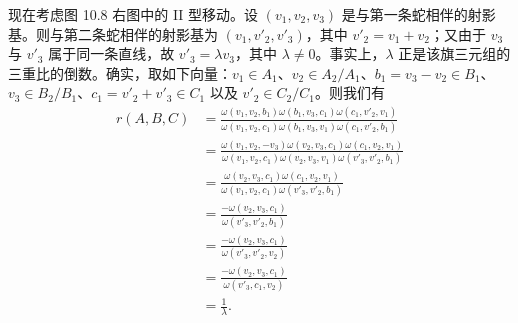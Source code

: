 现在考虑图 10.8 右图中的 II 型移动。设 $(v_1,v_2,v_3)$ 是与第一条蛇相伴的射影基。则与第二条蛇相伴的射影基为 $(v_1,v'_2,v'_3)$，其中 $v'_2=v_1+v_2$；又由于 $v_3$ 与 $v'_3$ 属于同一条直线，故 $v'_3=\lambda v_3$，其中 $\lambda\ne0$。事实上，$\lambda$ 正是该旗三元组的三重比的倒数。确实，取如下向量：$v_1\in A_1$、$v_2\in A_2/A_1$、$b_1=v_3-v_2\in B_1$、$v_3\in B_2/B_1$、$c_1=v'_2+v'_3\in C_1$ 以及 $v'_2\in C_2/C_1$。则我们有
\begin{align*}
r(A,B,C) &= \frac{\omega(v_1,v_2,b_1)\omega(b_1,v_3,c_1)\omega(c_1,v'_2,v_1)}{\omega(v_1,v_2,c_1)\omega(b_1,v_3,v_1)\omega(c_1,v'_2,b_1)}\\
&= \frac{\omega(v_1,v_2,-v_3)\omega(v_2,v_3,c_1)\omega(c_1,v_2,v_1)}{\omega(v_1,v_2,c_1)\omega(v_2,v_3,v_1)\omega(v'_3,v'_2,b_1)}\\
&= \frac{\omega(v_2,v_3,c_1)\omega(c_1,v_2,v_1)}{\omega(v_1,v_2,c_1)\omega(v'_3,v'_2,b_1)}\\
&= \frac{-\omega(v_2,v_3,c_1)}{\omega(v'_3,v'_2,b_1)}\\
&= \frac{-\omega(v_2,v_3,c_1)}{\omega(v'_3,v'_2,v_2)}\\
&= \frac{-\omega(v_2,v_3,c_1)}{\omega(v'_3,c_1,v_2)}\\
&= \frac{1}{\lambda}.
\end{align*}


